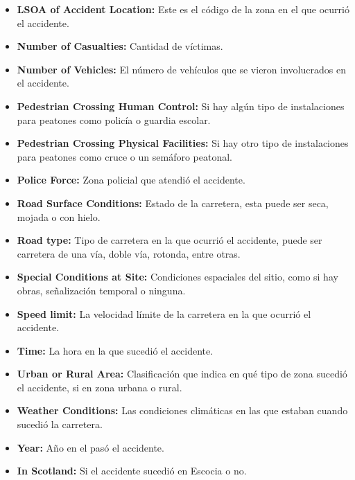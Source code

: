\documentclass[12pt]{article}
\begin{document}
\begin{itemize}
\begin{itemize}
\item \textbf{LSOA of Accident Location:} Este es el código de la zona en el que ocurrió el accidente. 

\item \textbf{Number of Casualties:} Cantidad de víctimas. 

\item \textbf{Number of Vehicles:} El número de vehículos que se vieron involucrados en el accidente. 

\item \textbf{Pedestrian Crossing Human Control:} Si hay algún tipo de instalaciones para peatones como policía o guardia escolar. 

\item \textbf{Pedestrian Crossing Physical Facilities:} Si hay otro tipo de instalaciones para peatones como cruce o un semáforo peatonal. 

\item \textbf{Police Force:} Zona policial que atendió el accidente. 

\item \textbf{Road Surface Conditions:} Estado de la carretera, esta puede ser seca, mojada o con hielo. 

\item \textbf{Road type:} Tipo de carretera en la que ocurrió el accidente, puede ser carretera de una vía, doble vía, rotonda, entre otras. 

\item \textbf{Special Conditions at Site:} Condiciones espaciales del sitio, como si hay obras, señalización temporal o ninguna.  

\item \textbf{Speed limit:} La velocidad límite de la carretera en la que ocurrió el accidente. 

\item \textbf{Time:} La hora en la que sucedió el accidente. 

\item \textbf{Urban or Rural Area:} Clasificación que indica en qué tipo de zona sucedió el accidente, si en zona urbana o rural. 

\item \textbf{Weather Conditions:} Las condiciones climáticas en las que estaban cuando sucedió la carretera. 

\item \textbf{Year:} Año en el pasó el accidente. 

\item \textbf{In Scotland:} Si el accidente sucedió en Escocia o no. 
\end{itemize}
\end{itemize}
\end{document}

